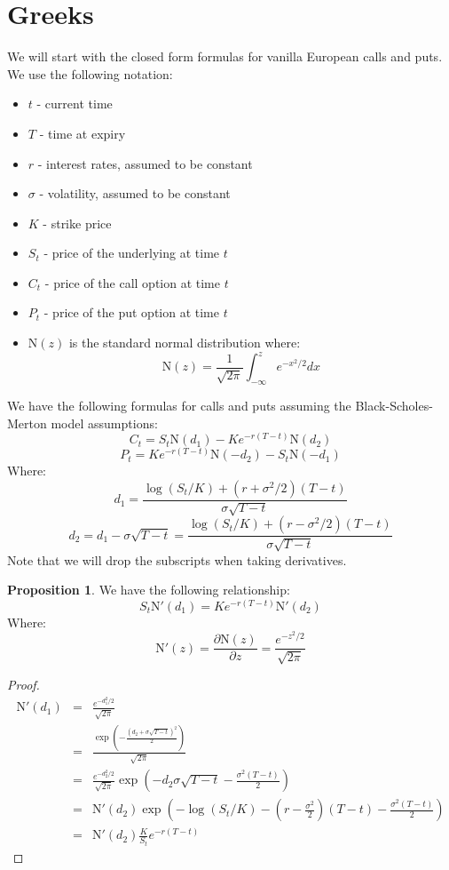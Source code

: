 \documentclass[11pt]{article}
\theoremstyle{definition}
\newtheorem{prop}{Proposition}[section]
\newcommand{\brac}[1]{\left(#1\right)}
\newcommand{\pardiff}[2]{\frac{\partial #1}{\partial #2}}
\newcommand{\normcdf}[1]{\text{N}\brac{#1}}
\newcommand{\normpdf}[1]{\text{N}'\brac{#1}}
\begin{document}
\section{Greeks}
	We will start with the closed form formulas for vanilla European calls and puts. We use the following notation:
	\begin{itemize}
		\item $t$ - current time
		\item $T$ - time at expiry
		\item $r$ - interest rates, assumed to be constant
		\item $\sigma$ - volatility, assumed to be constant
		\item $K$ - strike price
		\item $S_t$ - price of the underlying at time $t$
		\item $C_t$ - price of the call option at time $t$
		\item $P_t$ - price of the put option at time $t$
		\item $\normcdf{z}$ is the standard normal distribution where:
		$$\normcdf{z} = \frac{1}{\sqrt{2\pi}}\int_{-\infty}^{z}e^{-x^2/2}dx$$
	\end{itemize}
	We have the following formulas for calls and puts assuming the Black-Scholes-Merton model assumptions:
	$$C_t = S_t\normcdf{d_1} - Ke^{-r\brac{T-t}}\normcdf{d_2}$$
	$$P_t = Ke^{-r\brac{T-t}}\normcdf{-d_2} - S_t\normcdf{-d_1}$$
	Where: 
	$$ d_1 = \frac{\log\brac{S_t/K}+\brac{r+\sigma^2/2}\brac{T-t}}{\sigma\sqrt{T-t}}$$
	$$d_2 = d_1 -\sigma\sqrt{T-t} = \frac{\log\brac{S_t/K}+\brac{r-\sigma^2/2}\brac{T-t}}{\sigma\sqrt{T-t}}$$
	Note that we will drop the subscripts when taking derivatives. 
	\begin{prop}\label{trick1}
		We have the following relationship:
		$$ S_t \normpdf{d_1} = Ke^{-r\brac{T-t}}\normpdf{d_2}$$
		Where:
		$$ \normpdf{z} = \pardiff{\normcdf{z}}{z} = \frac{e^{-z^2/2}}{\sqrt{2\pi}}$$
	\end{prop}
	\begin{proof}
		\begin{eqnarray*}
			\normpdf{d_1} &=& \frac{e^{-d_1^2/2}}{\sqrt{2\pi}}\\
			&=& \frac{\exp\brac{-\frac{\brac{d_2 + \sigma\sqrt{T-t}}^2}{2}}}{\sqrt{2\pi}}\\
			&=& \frac{e^{-d_2^2/2}}{\sqrt{2\pi}}\exp\brac{-d_2\sigma\sqrt{T-t}-\frac{\sigma^2\brac{T-t}}{2}}\\
			&=& \normpdf{d_2}\exp\brac{-\log\brac{S_t/K} -\brac{r-\frac{\sigma^2}{2}}\brac{T-t}-\frac{\sigma^2\brac{T-t}}{2}}\\
			&=& \normpdf{d_2}\frac{K}{S_t}e^{-r\brac{T-t}}
		\end{eqnarray*}
	\end{proof}
\end{document}
